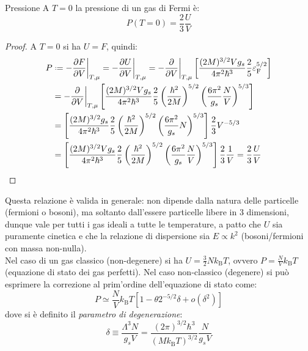 \begin{proposition}{Pressione}{}
	A $ T = 0 $ la pressione di un gas di Fermi è:
	\begin{equation}
		P(T = 0) = \frac{2}{3} \frac{U}{V}
	\end{equation}

	\tcblower

	\begin{proof}
		A $ T = 0 $ si ha $ U = F $, quindi:
		\begin{equation*}
			\begin{split}
				P
				& \defeq - \frac{\pa F}{\pa V}\bigg\vert_{T,\mu} = - \frac{\pa U}{\pa V}\bigg\vert_{T,\mu} = - \frac{\pa}{\pa V}\bigg\vert_{T,\mu} \left[ \frac{(2M)^{3/2} V g_s}{4\pi^2 \hbar^3} \frac{2}{5} \varepsilon_\text{F}^{5/2} \right] \\
				& = - \frac{\pa}{\pa V}\bigg\vert_{T,\mu} \left[ \frac{(2M)^{3/2} V g_s}{4\pi^2 \hbar^3} \frac{2}{5} \left( \frac{\hbar^2}{2M} \right)^{5/2} \left( \frac{6\pi^2}{g_s} \frac{N}{V} \right)^{5/3} \right] \\
				& = \left[ \frac{(2M)^{3/2} g_s}{4\pi^2 \hbar^3} \frac{2}{5} \left( \frac{\hbar^2}{2M} \right)^{5/2} \left( \frac{6\pi^2}{g_s} N \right)^{5/3} \right] \frac{2}{3} V^{-5/3} \\
				& = \left[ \frac{(2M)^{3/2} V g_s}{4\pi^2 \hbar^3} \frac{2}{5} \left( \frac{\hbar^2}{2M} \right)^{5/2} \left( \frac{6\pi^2}{g_s} \frac{N}{V} \right)^{5/3} \right] \frac{2}{3} \frac{1}{V} = \frac{2}{3} \frac{U}{V}
			\end{split}
		\end{equation*}
	\end{proof}
\end{proposition}

Questa relazione è valida in generale: non dipende dalla natura delle particelle (fermioni o bosoni), ma soltanto dall'essere particelle libere in 3 dimensioni, dunque vale per tutti i gas ideali a tutte le temperature, a patto che $ U $ sia puramente cinetica e che la relazione di dispersione sia $ E \propto k^2 $ (bosoni/fermioni con massa non-nulla). \\
Nel caso di un gas classico (non-degenere) si ha $ U = \frac{3}{2} N k_\text{B} T $, ovvero $ P = \frac{N}{V} k_\text{B} T $ (equazione di stato dei gas perfetti). Nel caso non-classico (degenere) si può esprimere la correzione al prim'ordine dell'equazione di stato come:
\begin{equation}
	P \simeq \frac{N}{V} k_\text{B} T \left[ 1 - \theta 2^{-5/2} \delta + o(\delta^2) \right]
\end{equation}
dove si è definito il \textit{parametro di degenerazione}:
\begin{equation}
	\delta \equiv \frac{\Lambda^3 N}{g_s V} = \frac{(2\pi)^{3/2} \hbar^3}{(M k_\text{B} T)^{3/2}} \frac{N}{g_s V}
\end{equation}

